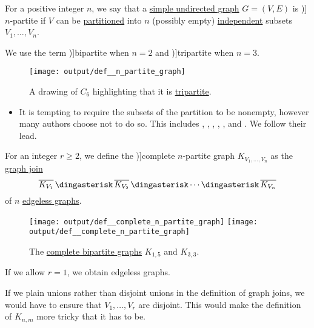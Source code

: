 \begin{definition}\label{def:n_partite_graph}
  For a positive integer \( n \), we say that a \hyperref[def:undirected_graph]{simple undirected graph} \( G = (V, E) \) is \term[ru=\( n \)-дольный (граф) (\cite[11]{Емеличев1990})]{\( n \)-partite} if \( V \) can be \hyperref[def:set_partition]{partitioned} into \( n \) (possibly empty) \hyperref[def:graph_independent_set]{independent} subsets \( V_1, \ldots, V_n \).

  We use the term \term[ru=двудольный (граф) (\cite[11]{Емеличев1990})]{bipartite} when \( n = 2 \) and \term[ru=трёхдольный (граф) (\cite[11]{Емеличев1990})]{tripartite} when \( n = 3 \).

  \begin{figure}[!ht]
    \centering
    \texttt{[image: output/def\_\_n\_partite\_graph]}
    \caption{A drawing of \hyperref[def:cycle_graph]{\( C_6 \)} highlighting that it is \hyperref[def:n_partite_graph]{tripartite}.}\label{fig:def:n_partite_graph}
  \end{figure}
\end{definition}
\begin{itemize}
  \item It is tempting to require the subsets of the partition to be nonempty, however many authors choose not to do so. This includes , , , , ,  and . We follow their lead.
\end{itemize}

\begin{definition}\label{def:complete_n_partite_graph}
  For an integer \( r \geq 2 \), we define the \term[ru=полный \( n \)-дольный (граф) (\cite[\textnumero 1]{Емеличев1990})]{complete \( n \)-partite} graph \( K_{V_1,\ldots,V_n} \) as the \hyperref[def:graph_join]{graph join}
  \begin{equation*}
    \oline{K_{V_1}} \Ast \oline{K_{V_2}} \Ast \cdots \Ast \oline{K_{V_n}}
  \end{equation*}
  of \( n \) \hyperref[def:edgeless_graph]{edgeless graphs}.

  \begin{figure}[!ht]
    \hfill
    \texttt{[image: output/def\_\_complete\_n\_partite\_graph]}
    \hfill
    \texttt{[image: output/def\_\_complete\_n\_partite\_graph]}
    \hfill
    \hfill
    \caption{The \hyperref[def:complete_n_partite_graph]{complete bipartite graphs} \( K_{1,5} \) and \( K_{3,3} \).}\label{fig:def:complete_n_partite_graph}
  \end{figure}
\end{definition}
\begin{comments}
  \item If we allow \( r = 1 \), we obtain edgeless graphs.
  \item If we plain unions rather than disjoint unions in the definition of graph joins, we would have to ensure that \( V_1, \ldots, V_r \) are disjoint. This would make the definition of \( K_{n,m} \) more tricky that it has to be.
\end{comments}

